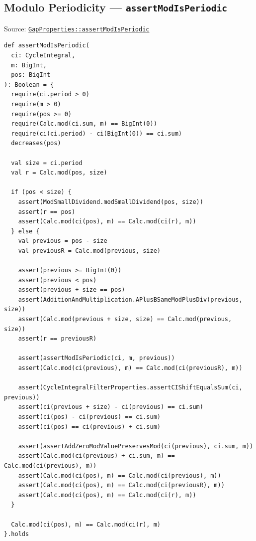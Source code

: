 \subsection{Modulo Periodicity --- \texorpdfstring{\texttt{assert\allowbreak Mod\allowbreak Is\allowbreak Periodic}}{assertModIsPeriodic}}

{\raggedright Source: \href{https://github.com/thiagomata/prime-numbers/blob/integral-cycle-article-v1.0.0/src/main/scala/v1/chapter4/cycle/integral/recursive/properties/GapProperties.scala}{\texttt{Gap\allowbreak Properties::assert\allowbreak Mod\allowbreak Is\allowbreak Periodic}}\par}

\begin{lstlisting}[style=scala]
def assertModIsPeriodic(
  ci: CycleIntegral,
  m: BigInt,
  pos: BigInt
): Boolean = {
  require(ci.period > 0)
  require(m > 0)
  require(pos >= 0)
  require(Calc.mod(ci.sum, m) == BigInt(0))
  require(ci(ci.period) - ci(BigInt(0)) == ci.sum)
  decreases(pos)

  val size = ci.period
  val r = Calc.mod(pos, size)

  if (pos < size) {
    assert(ModSmallDividend.modSmallDividend(pos, size))
    assert(r == pos)
    assert(Calc.mod(ci(pos), m) == Calc.mod(ci(r), m))
  } else {
    val previous = pos - size
    val previousR = Calc.mod(previous, size)

    assert(previous >= BigInt(0))
    assert(previous < pos)
    assert(previous + size == pos)
    assert(AdditionAndMultiplication.APlusBSameModPlusDiv(previous, size))
    assert(Calc.mod(previous + size, size) == Calc.mod(previous, size))
    assert(r == previousR)

    assert(assertModIsPeriodic(ci, m, previous))
    assert(Calc.mod(ci(previous), m) == Calc.mod(ci(previousR), m))

    assert(CycleIntegralFilterProperties.assertCIShiftEqualsSum(ci, previous))
    assert(ci(previous + size) - ci(previous) == ci.sum)
    assert(ci(pos) - ci(previous) == ci.sum)
    assert(ci(pos) == ci(previous) + ci.sum)

    assert(assertAddZeroModValuePreservesMod(ci(previous), ci.sum, m))
    assert(Calc.mod(ci(previous) + ci.sum, m) == Calc.mod(ci(previous), m))
    assert(Calc.mod(ci(pos), m) == Calc.mod(ci(previous), m))
    assert(Calc.mod(ci(pos), m) == Calc.mod(ci(previousR), m))
    assert(Calc.mod(ci(pos), m) == Calc.mod(ci(r), m))
  }

  Calc.mod(ci(pos), m) == Calc.mod(ci(r), m)
}.holds
\end{lstlisting}

